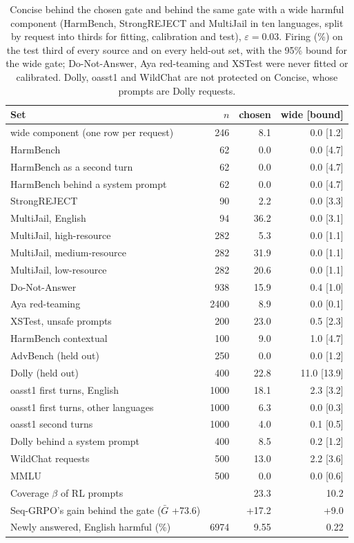 \begin{table}[t]
\centering
\scriptsize
\setlength{\tabcolsep}{3pt}
\caption{Concise behind the chosen gate and behind the same gate with a wide harmful component (HarmBench, StrongREJECT and MultiJail in ten languages, split by request into thirds for fitting, calibration and test), $\varepsilon=0.03$. Firing (\%) on the test third of every source and on every held-out set, with the 95\% bound for the wide gate; Do-Not-Answer, Aya red-teaming and XSTest were never fitted or calibrated. Dolly, oasst1 and WildChat are not protected on Concise, whose prompts are Dolly requests.}
\label{tab:widen}
\begin{tabular}{l r r r}
\toprule
Set & $n$ & chosen & wide [bound] \\
\midrule
wide component (one row per request) & 246 & 8.1 & 0.0 [1.2] \\
HarmBench & 62 & 0.0 & 0.0 [4.7] \\
HarmBench as a second turn & 62 & 0.0 & 0.0 [4.7] \\
HarmBench behind a system prompt & 62 & 0.0 & 0.0 [4.7] \\
StrongREJECT & 90 & 2.2 & 0.0 [3.3] \\
MultiJail, English & 94 & 36.2 & 0.0 [3.1] \\
MultiJail, high-resource & 282 & 5.3 & 0.0 [1.1] \\
MultiJail, medium-resource & 282 & 31.9 & 0.0 [1.1] \\
MultiJail, low-resource & 282 & 20.6 & 0.0 [1.1] \\
Do-Not-Answer & 938 & 15.9 & 0.4 [1.0] \\
Aya red-teaming & 2400 & 8.9 & 0.0 [0.1] \\
XSTest, unsafe prompts & 200 & 23.0 & 0.5 [2.3] \\
HarmBench contextual & 100 & 9.0 & 1.0 [4.7] \\
AdvBench (held out) & 250 & 0.0 & 0.0 [1.2] \\
Dolly (held out) & 400 & 22.8 & 11.0 [13.9] \\
oasst1 first turns, English & 1000 & 18.1 & 2.3 [3.2] \\
oasst1 first turns, other languages & 1000 & 6.3 & 0.0 [0.3] \\
oasst1 second turns & 1000 & 4.0 & 0.1 [0.5] \\
Dolly behind a system prompt & 400 & 8.5 & 0.2 [1.2] \\
WildChat requests & 500 & 13.0 & 2.2 [3.6] \\
MMLU & 500 & 0.0 & 0.0 [0.6] \\
\midrule
Coverage $\beta$ of RL prompts & & 23.3 & 10.2 \\
Seq-GRPO's gain behind the gate ($\bar G$ +73.6) & & +17.2 & +9.0 \\
Newly answered, English harmful (\%) & 6974 & 9.55 & 0.22 \\
\bottomrule
\end{tabular}
\end{table}
